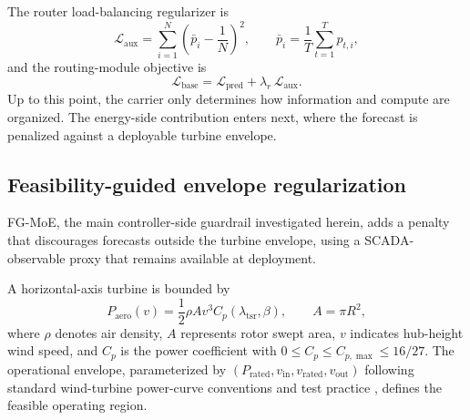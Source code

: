 \documentclass[review,1p,times]{elsarticle}
\begin{document}
The router load-balancing regularizer is
\begin{equation}
\mathcal{L}_{\text{aux}} = \sum_{i=1}^{N}\left(\bar{p}_i - \frac{1}{N}\right)^2,\qquad
\bar{p}_i=\frac{1}{T}\sum_{t=1}^{T}p_{t,i},
\label{eq:loss_aux}
\end{equation}
\noindent and the routing-module objective is
\begin{equation}
\mathcal{L}_{\text{base}} = \mathcal{L}_{\text{pred}} + \lambda_r\,\mathcal{L}_{\text{aux}}.
\label{eq:loss_base}
\end{equation}
Up to this point, the carrier only determines how information and compute are organized. The energy-side contribution enters next, where the forecast is penalized against a deployable turbine envelope.

\subsection{Feasibility-guided envelope regularization}
\label{sec:fg_moe}
FG-MoE, the main controller-side guardrail investigated herein, adds a penalty that discourages forecasts outside the turbine envelope, using a SCADA-observable proxy that remains available at deployment.

A horizontal-axis turbine is bounded by
\begin{equation}
P_{\mathrm{aero}}(v)=\frac{1}{2}\rho A v^3 C_p(\lambda_{\mathrm{tsr}},\beta),\qquad A=\pi R^2,
\label{eq:fg_aero}
\end{equation}
where $\rho$ denotes air density, $A$ represents rotor swept area, $v$ indicates hub-height wind speed, and $C_p$ is the power coefficient with $0\le C_p\le C_{p,\max}\le 16/27$. The operational envelope, parameterized by $(P_{\mathrm{rated}},v_{\mathrm{in}},v_{\mathrm{rated}},v_{\mathrm{out}})$ following standard wind-turbine power-curve conventions and test practice \citep{burton2011wind,iec61400_12_1_2017,martincalzada2025optimized}, defines the feasible operating region.
\end{document}
